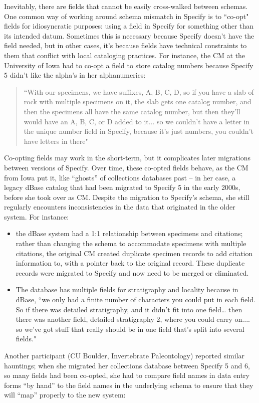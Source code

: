 Inevitably, there are fields that cannot be easily cross-walked between schemas. One common way of working around schema mismatch in Specify is to “co-opt" fields for idiosyncratic purposes: using a field in Specify for something other than its intended datum. Sometimes this is necessary because Specify doesn’t have the field needed, but in other cases, it’s because fields have technical constraints to them that conflict with local cataloging practices. For instance, the CM at the University of Iowa had to co-opt a field to store catalog numbers because Specify 5 didn’t like the alpha’s in her alphanumerics:
\begin{quote}
“With our specimens, we have suffixes, A, B, C, D, so if you have a slab of rock with multiple specimens on it, the slab gets one catalog number, and then the specimens all have the same catalog number, but then they'll would have an A, B, C, or D added to it... so we couldn't have a letter in the unique number field in Specify, because it's just numbers, you couldn't have letters in there"
\end{quote}
Co-opting fields may work in the short-term, but it complicates later migrations between versions of Specify. Over time, these co-opted fields behave, as the CM from Iowa put it, like “ghosts” of collections databases past -- in her case, a legacy dBase catalog that had been migrated to Specify 5 in the early 2000s, before she took over as CM. Despite the migration to Specify's schema, she still regularly encounters inconsistencies in the data that originated in the older system. For instance: 
\begin{itemize}
\item the dBase system had a 1:1 relationship between specimens and citations; rather than changing the schema to accommodate specimens with multiple citations, the original CM created duplicate specimen records to add citation information to, with a pointer back to the original record. These duplicate records were migrated to Specify and now need to be merged or eliminated.
\item The database has multiple fields for stratigraphy and locality because in dBase, “we only had a finite number of characters you could put in each field. So if there was detailed stratigraphy, and it didn't fit into one field… then there was another field, detailed stratigraphy 2, where you could carry on.... so we've got stuff that really should be in one field that's split into several fields."  
\end{itemize}
Another participant (CU Boulder, Invertebrate Paleontology) reported similar hauntings; when she migrated her collections database between Specify 5 and 6, so many fields had been co-opted, she had to compare field names in data entry forms “by hand” to the field names in the underlying schema to ensure that they will “map” properly to the new system: 
